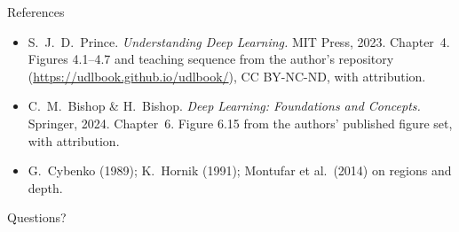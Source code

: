 \documentclass[aspectratio=169, 11pt]{beamer}
\begin{document}
\begin{frame}{References}
  \footnotesize
  \begin{itemize}
    \item S.~J.~D.~Prince. \textit{Understanding Deep
          Learning.} MIT Press, 2023. Chapter~4. Figures
          4.1--4.7 and teaching sequence from the author's
          repository (\url{https://udlbook.github.io/udlbook/}),
          CC BY-NC-ND, with attribution.
    \item C.~M.~Bishop \& H.~Bishop. \textit{Deep Learning:
          Foundations and Concepts.} Springer, 2024.
          Chapter~6. Figure 6.15 from the authors' published
          figure set, with attribution.
    \item G.~Cybenko (1989); K.~Hornik (1991);
          Montufar et al.\ (2014) on regions and depth.
  \end{itemize}
\end{frame}

\begin{frame}[standout]
  Questions?
\end{frame}
\end{document}

